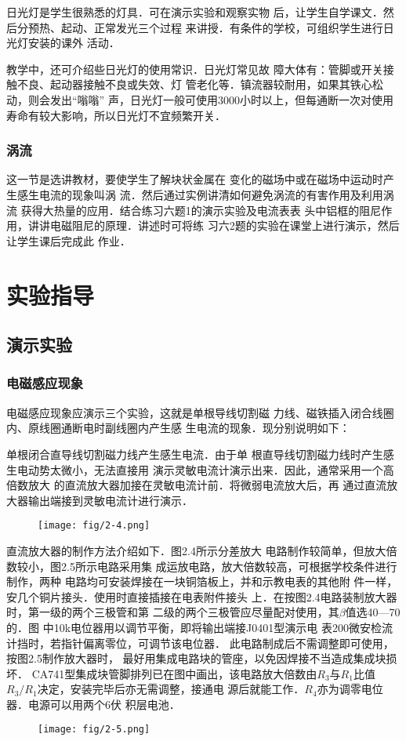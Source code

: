 日光灯是学生很熟悉的灯具．可在演示实验和观察实物
后，让学生自学课文．然后分预热、起动、正常发光三个过程
来讲授．有条件的学校，可组织学生进行日光灯安装的课外
活动．

教学中，还可介绍些日光灯的使用常识．日光灯常见故
障大体有：管脚或开关接触不良、起动器接触不良或失效、灯
管老化等．镇流器较耐用，如果其铁心松动，则会发出“嗡嗡”
声，日光灯一般可使用3000小时以上，但每通断一次对使用
寿命有较大影响，所以日光灯不宜频繁开关．

\subsubsection{涡流}

这一节是选讲教材，要使学生了解块状金属在
变化的磁场中或在磁场中运动时产生感生电流的现象叫涡
流．然后通过实例讲清如何避免涡流的有害作用及利用涡流
获得大热量的应用．结合练习六题1的演示实验及电流表表
头中铝框的阻尼作用，讲讲电磁阻尼的原理．讲述时可将练
习六2题的实验在课堂上进行演示，然后让学生课后完成此
作业．

\section{实验指导}
\subsection{演示实验}
\subsubsection{电磁感应现象}
电磁感应现象应演示三个实验，这就是单根导线切割磁
力线、磁铁插入闭合线圈内、原线圈通断电时副线圈内产生感
生电流的现象．现分别说明如下：

单根闭合直导线切割磁力线产生感生电流．由于单
根直导线切割磁力线时产生感生电动势太微小，无法直接用
演示灵敏电流计演示出来．因此，通常采用一个高倍数放大
的直流放大器加接在灵敏电流计前．将微弱电流放大后，再
通过直流放大器输出端接到灵敏电流计进行演示．
\begin{figure}[htp]
    \centering
\texttt{[image: fig/2-4.png]}
    \caption{}
\end{figure}

直流放大器的制作方法介绍如下．图2.4所示分差放大
电路制作较简单，但放大倍数较小，图2.5所示电路采用集
成运放电路，放大倍数较高，可根据学校条件进行制作，两种
电路均可安装焊接在一块铜箔板上，并和示教电表的其他附
件一样，安几个铜片接头．使用时直接插接在电表附件接头
上．在按图2.4电路装制放大器时，第一级的两个三极管和第
二级的两个三极管应尽量配对使用，其$\beta$值选40—70的．图
中10k电位器用以调节平衡，即将输出端接J0401型演示电
表200微安检流计挡时，若指针偏离零位，可调节该电位器．
此电路制成后不需调整即可使用，按图2.5制作放大器时，
最好用集成电路块的管座，以免因焊接不当造成集成块损坏．
CA741型集成块管脚排列已在图中画出，该电路放大倍数由$R_3$与$R_1$比值$R_3/R_1$决定，安装完毕后亦无需调整，接通电
源后就能工作．$R_4$亦为调零电位器．电源可以用两个6伏
积层电池．
\begin{figure}[htp]
    \centering
\texttt{[image: fig/2-5.png]}
    \caption{}
\end{figure}

